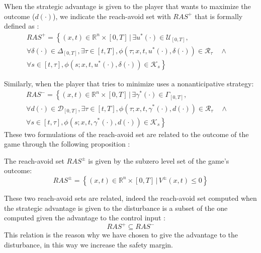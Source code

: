 When the strategic advantage is given to the player that wants to maximize the outcome ($d(\cdot)$), we indicate the reach-avoid set with $RAS^+$ that is formally defined as \cite{new_paper}:
\begin{multline}
    \label{ras_p}
    RAS^+ = 
    \left\{
        (x,t) \in \mathbb{R}^n \times [0,T] \,|\, \exists u^*(\cdot) \in \mathcal{U}_{[0, T]},
    \right.\\
    \left.
          \forall \delta(\cdot) \in \Delta_{[0, T]}, \exists \tau \in [t, T], \phi(\tau; x, t, u^*(\cdot), \delta(\cdot)) \in \mathcal{R}_\tau \quad \wedge \quad       
    \right.\\
    \left.
        \forall s \in [t, \tau], \phi(s; x, t, u^*(\cdot), \delta(\cdot)) \in \mathcal{K}_s
    \right\}
\end{multline}

Similarly, when the player that tries to minimize uses a nonanticipative strategy:
\begin{multline}
    \label{ras_m}
    RAS^- = 
    \left\{
        (x,t) \in \mathbb{R}^n \times [0,T] \,|\, \exists \gamma^*(\cdot) \in \Gamma_{[0, T]},
    \right.\\
    \left.
          \forall d(\cdot) \in \mathcal{D}_{[0, T]}, \exists \tau \in [t, T], \phi(\tau; x, t, \gamma^*(\cdot), d(\cdot)) \in \mathcal{R}_\tau \quad \wedge \quad       
    \right.\\
    \left.
        \forall s \in [t, \tau], \phi(s; x, t, \gamma^*(\cdot), d(\cdot)) \in \mathcal{K}_s
    \right\}
\end{multline}
These two formulations of the reach-avoid set are related to the outcome of the game through the following proposition \cite{new_paper}:
\begin{prop}
    \label{ras_p_m_v}
    The reach-avoid set $RAS^\pm$ is given by the subzero level set of the game's outcome: 
    \[
        RAS^\pm=
        \left\{
            (x, t) \in \mathbb{R}^n \times [0, T] \,|\, V^\pm(x,t) \leq 0
        \right\}
    \]
\end{prop}
These two reach-avoid sets are related, indeed the reach-avoid set computed when the strategic advantage is given to the disturbance is a subset of the one computed given the advantage to the control input \cite{new_paper}:
\begin{equation}
    RAS^+ \subseteq RAS^-
\end{equation}
This relation is the reason why we have chosen to give the advantage to the disturbance, in this way we increase the safety margin.

